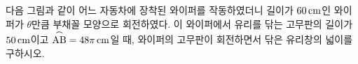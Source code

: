 다음 그림과 같이 어느 자동차에 장착된 와이퍼를 작동하였더니 길이가 $60\mkern3mu \mathrm{cm}$인 와이퍼가 $\theta$만큼 부채꼴 모양으로 회전하였다. 이 와이퍼에서 유리를 닦는 고무판의 길이가 $50\mkern3mu \mathrm{cm}$이고 $\overset{\frown}{\mathrm{AB}}=48\pi\mkern3mu \mathrm{cm}$일 때, 와이퍼의 고무판이 회전하면서 닦은 유리창의 넓이를 구하시오. 
\par\smallskip\begin{center}\resizebox{\ifdim\width>\linewidth\linewidth\else\width\fi}{!}{}\end{center}
